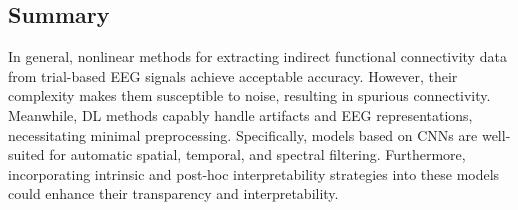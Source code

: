 \subsection{Summary}

In general, nonlinear methods for extracting indirect functional connectivity data from trial-based EEG signals achieve acceptable accuracy. However, their complexity makes them susceptible to noise, resulting in spurious connectivity. Meanwhile, DL methods capably handle artifacts and EEG representations, necessitating minimal preprocessing. Specifically, models based on CNNs are well-suited for automatic spatial, temporal, and spectral filtering. Furthermore, incorporating intrinsic and post-hoc interpretability strategies into these models could enhance their transparency and interpretability.